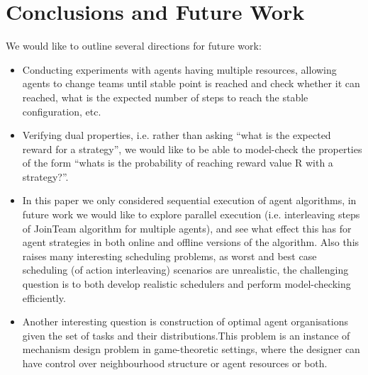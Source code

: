 \documentclass{llncs}
\begin{document}
\section{Conclusions and Future Work}

We would like to outline several directions for future work:
\begin{itemize}

 \item Conducting experiments with agents having multiple resources, allowing agents to change teams until stable point is reached and check whether it can reached, what is the expected number of steps to reach the stable configuration, etc.

\item Verifying dual properties, i.e. rather than asking ``what is the expected reward for a strategy'', we would like to be able to model-check the properties of the form ``whats is the probability of reaching reward value R with a strategy?''.

 \item In this paper we only considered sequential execution of agent algorithms, in future work we would like to explore parallel execution (i.e. interleaving steps of JoinTeam algorithm for multiple agents), and see what effect this has for agent strategies in both online and offline versions of the algorithm. Also this raises many interesting scheduling problems, as worst and best case scheduling (of action interleaving) scenarios are unrealistic, the challenging question is to both develop realistic schedulers and perform model-checking efficiently.

 \item Another interesting question is construction of optimal agent organisations given the set of tasks and their distributions.This problem is an instance of mechanism design problem in game-theoretic settings, where the designer can have control over neighbourhood structure or agent resources or both.

\end{itemize}



\end{document}
